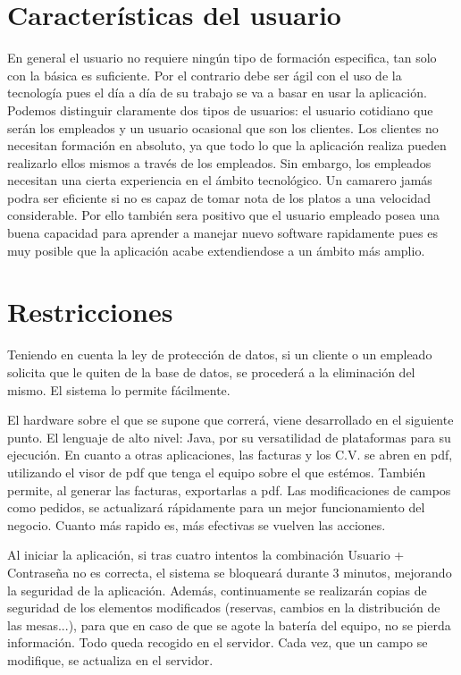 \documentclass[spanish,a4paper,12pt]{report}	%
\begin{document}
\section{Características del usuario}
	En general el usuario no requiere ningún tipo de formación especifica, tan solo con la básica es suficiente. Por el contrario debe ser ágil con el uso de la tecnología pues el día a día de su trabajo se va a basar en usar la aplicación. Podemos distinguir claramente dos tipos de usuarios: el usuario cotidiano que serán los empleados y un usuario ocasional que son los clientes. Los clientes no necesitan formación en absoluto, ya que todo lo que la aplicación realiza pueden realizarlo ellos mismos a través de los empleados. Sin embargo, los empleados necesitan una cierta experiencia en el ámbito tecnológico. Un camarero jamás podra ser eficiente si no es capaz de tomar nota de los platos a una velocidad considerable. Por ello también sera positivo que el usuario empleado posea una buena capacidad para aprender a manejar nuevo software rapidamente pues es muy posible que la aplicación acabe extendiendose a un ámbito más amplio.

\section{Restricciones}

Teniendo en cuenta la ley de protección de datos, si un cliente o un empleado solicita que le quiten de la base de datos, se procederá a la eliminación del mismo. El sistema lo permite fácilmente. 

El hardware sobre el que se supone que correrá, viene desarrollado en el siguiente punto. El lenguaje de alto nivel: Java, por su versatilidad de plataformas para su ejecución. En cuanto a otras aplicaciones, las facturas y los C.V. se abren en pdf, utilizando el visor de pdf que tenga el equipo sobre el que estémos. También permite, al generar las facturas, exportarlas a pdf. Las modificaciones de campos como pedidos, se actualizará rápidamente para un mejor funcionamiento del negocio. Cuanto más rapido es, más efectivas se vuelven las acciones.

Al iniciar la aplicación, si tras cuatro intentos la combinación Usuario + Contraseña no es correcta, el sistema se bloqueará durante 3 minutos, mejorando la seguridad de la aplicación. Además, continuamente se realizarán copias de seguridad de los elementos modificados (reservas, cambios en la distribución de las mesas...), para que en caso de que se agote la batería del equipo, no se pierda información. Todo queda recogido en el servidor. Cada vez, que un campo se modifique, se actualiza en el servidor.
\end{document}
